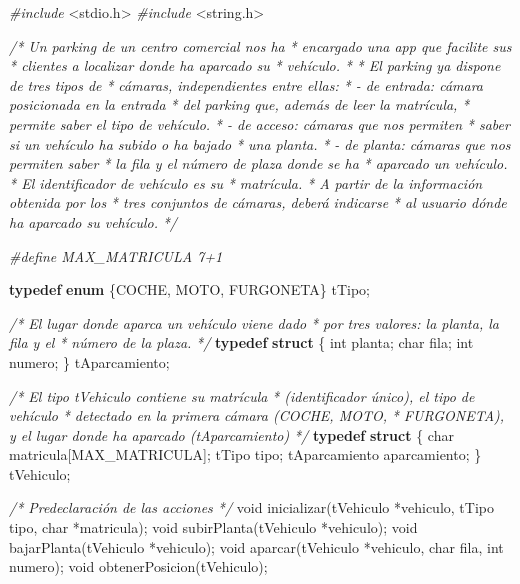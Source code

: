\documentclass[
]{book}
\newenvironment{Shaded}{\begin{snugshade}}{\end{snugshade}}
\newcommand{\CommentTok}[1]{\textcolor[rgb]{0.56,0.35,0.01}{\textit{#1}}}
\newcommand{\DataTypeTok}[1]{\textcolor[rgb]{0.13,0.29,0.53}{#1}}
\newcommand{\ImportTok}[1]{#1}
\newcommand{\KeywordTok}[1]{\textcolor[rgb]{0.13,0.29,0.53}{\textbf{#1}}}
\newcommand{\NormalTok}[1]{#1}
\newcommand{\PreprocessorTok}[1]{\textcolor[rgb]{0.56,0.35,0.01}{\textit{#1}}}
\begin{document}
\begin{Shaded}
\begin{Highlighting}[]
\PreprocessorTok{\#include }\ImportTok{\textless{}stdio.h\textgreater{}}
\PreprocessorTok{\#include }\ImportTok{\textless{}string.h\textgreater{}}

\CommentTok{/* Un parking de un centro comercial nos ha}
\CommentTok{ * encargado una app que facilite sus}
\CommentTok{ * clientes a localizar donde ha aparcado su}
\CommentTok{ * vehículo.}
\CommentTok{ *}
\CommentTok{ * El parking ya dispone de tres tipos de}
\CommentTok{ * cámaras, independientes entre ellas:}
\CommentTok{ * {-} de entrada: cámara posicionada en la entrada}
\CommentTok{ *   del parking que, además de leer la matrícula,}
\CommentTok{ *   permite saber el tipo de vehículo.}
\CommentTok{ * {-} de acceso: cámaras que nos permiten}
\CommentTok{ *   saber si un vehículo ha subido o ha bajado}
\CommentTok{ *   una planta.}
\CommentTok{ * {-} de planta: cámaras que nos permiten saber}
\CommentTok{ *   la fila y el número de plaza donde se ha}
\CommentTok{ *   aparcado un vehículo.}
\CommentTok{ * El identificador de vehículo es su}
\CommentTok{ * matrícula.}
\CommentTok{ * A partir de la información obtenida por los}
\CommentTok{ * tres conjuntos de cámaras, deberá indicarse}
\CommentTok{ * al usuario dónde ha aparcado su vehículo.}
\CommentTok{ */}

\PreprocessorTok{\#define MAX\_MATRICULA 7+1}

\KeywordTok{typedef} \KeywordTok{enum}\NormalTok{ \{COCHE, MOTO, FURGONETA\} tTipo;}

\CommentTok{/* El lugar donde aparca un vehículo viene dado}
\CommentTok{ * por tres valores: la planta, la fila y el}
\CommentTok{ * número de la plaza.}
\CommentTok{ */}
\KeywordTok{typedef} \KeywordTok{struct}\NormalTok{ \{}
    \DataTypeTok{int}\NormalTok{ planta;}
    \DataTypeTok{char}\NormalTok{ fila;}
    \DataTypeTok{int}\NormalTok{ numero;}
\NormalTok{\} tAparcamiento;}

\CommentTok{/* El tipo tVehiculo contiene su matrícula}
\CommentTok{ * (identificador único), el tipo de vehículo}
\CommentTok{ * detectado en la primera cámara (COCHE, MOTO,}
\CommentTok{ * FURGONETA), y el lugar donde ha aparcado (tAparcamiento)}
\CommentTok{ */}
\KeywordTok{typedef} \KeywordTok{struct}\NormalTok{ \{}
    \DataTypeTok{char}\NormalTok{ matricula[MAX\_MATRICULA];}
\NormalTok{    tTipo tipo;}
\NormalTok{    tAparcamiento aparcamiento;}
\NormalTok{\} tVehiculo;}

\CommentTok{/* Predeclaración de las acciones */}
\DataTypeTok{void}\NormalTok{ inicializar(tVehiculo *vehiculo, tTipo tipo, }\DataTypeTok{char}\NormalTok{ *matricula);}
\DataTypeTok{void}\NormalTok{ subirPlanta(tVehiculo *vehiculo);}
\DataTypeTok{void}\NormalTok{ bajarPlanta(tVehiculo *vehiculo);}
\DataTypeTok{void}\NormalTok{ aparcar(tVehiculo *vehiculo, }\DataTypeTok{char}\NormalTok{ fila, }\DataTypeTok{int}\NormalTok{ numero);}
\DataTypeTok{void}\NormalTok{ obtenerPosicion(tVehiculo);}


\end{Highlighting}
\end{Shaded}
\end{document}
